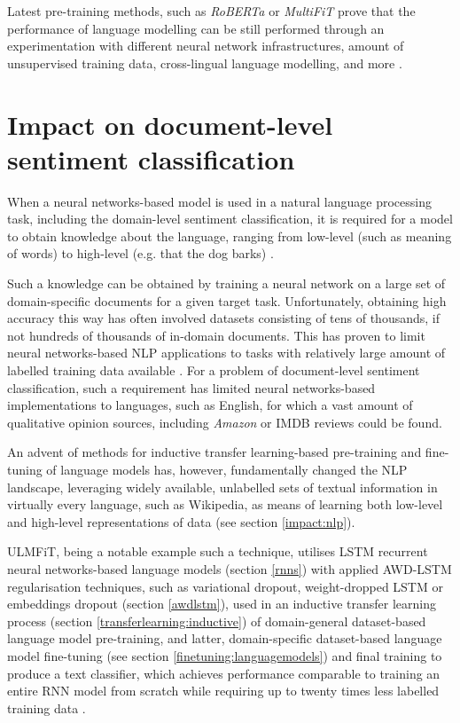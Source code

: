 Latest pre-training methods, such as \emph{RoBERTa} \cite{liu:roberta} or \emph{MultiFiT} \cite{howard:multifit} prove that the performance of language modelling can be still performed through an experimentation with different neural network infrastructures, amount of unsupervised training data, cross-lingual language modelling, and more \cite{state_of_nlp_2019}.

\section{Impact on document-level sentiment classification}

When a neural networks-based model is used in a natural language processing task, including the domain-level sentiment classification, it is required for a model to obtain knowledge about the language, ranging from low-level (such as meaning of words) to high-level (e.g. that the dog barks) \cite{raffel:limitsoftransferlearning}.

Such a knowledge can be obtained by training a neural network on a large set of domain-specific documents for a given target task. Unfortunately, obtaining high accuracy this way has often involved datasets consisting of tens of thousands, if not hundreds of thousands of in-domain documents. This has proven to limit neural networks-based NLP applications to tasks with relatively large amount of labelled training data available \cite{ulmfit}. For a problem of document-level sentiment classification, such a requirement has limited neural networks-based implementations to languages, such as English, for which a vast amount of qualitative opinion sources, including \emph{Amazon} or {IMDB} reviews could be found.

An advent of methods for inductive transfer learning-based pre-training and fine-tuning of language models has, however, fundamentally changed the NLP landscape, leveraging widely available, unlabelled sets of textual information in virtually every language, such as Wikipedia, as means of learning both low-level and high-level representations of data (see section \ref{impact:nlp}).

ULMFiT, being a notable example such a technique, utilises LSTM recurrent neural networks-based language models (section \ref{rnns}) with applied AWD-LSTM regularisation techniques, such as variational dropout, weight-dropped LSTM or embeddings dropout (section \ref{awdlstm}), used in an inductive transfer learning process (section \ref{transferlearning:inductive}) of domain-general dataset-based language model pre-training, and latter, domain-specific dataset-based language model fine-tuning (see section \ref{finetuning:languagemodels}) and final training to produce a text classifier, which achieves performance comparable to training an entire RNN model from scratch while requiring up to twenty times less labelled training data \cite{state_of_nlp_2019,ulmfit}.


